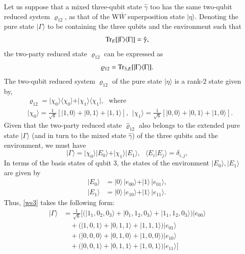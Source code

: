 Let us suppose that a mixed  three-qubit state $\hat\gamma$ too has the same two-qubit reduced system $\varrho_{12}$, as that of the W$\bar W$ superposition state $\vert \eta\rangle.$ Denoting the pure state $\vert \Gamma\rangle$ to be containing the three qubits and the environment such that  
\[ 
{\rm Tr}_{E}[\vert\Gamma\rangle\langle \Gamma\vert]=\hat\gamma,
\] 
the two-party reduced state $\varrho_{12}$ can be expressed as 
$$
\varrho_{12}={\rm Tr}_{3, E}[\vert \Gamma\rangle\langle \Gamma\vert].
$$ 
The two-qubit reduced system $\varrho_{12}$ of the pure state $\vert\eta\rangle$ is a rank-2 state given by,  
\begin{align*}
& \varrho_{12}=\vert \chi_0\rangle\langle \chi_0\vert + 
\vert \chi_1\rangle\langle \chi_1\vert, \ \ \ \mbox{where}\label{ws2}\\ 
& \vert \chi_0\rangle=\frac{1}{\sqrt{6}}[|1,0\rangle+|0,1\rangle+|1,1\rangle], \ \ \vert \chi_1\rangle=\frac{1}{\sqrt{6}}[|0,0\rangle+|0,1\rangle+|1,0\rangle].  \nonumber
\end{align*}
Given that the two-party reduced state $\hat{\varrho}_{12}$ also belongs to the extended pure state $\vert\Gamma\rangle$ (and in turn to the mixed state $\hat\gamma$) of the three qubits and the environment, we must have  
\begin{equation}
\vert\Gamma\rangle=\vert \chi_0\rangle\vert E_0\rangle +\vert \chi_1\rangle\vert E_1\rangle, \ \ \ \langle E_i\vert E_j\rangle=\delta_{i,j},\label{ws3}
 \end{equation}     
In terms of the basis states of qubit 3, the states of the environment $\vert E_{0}\rangle, \vert E_{1}\rangle$ are given by
\begin{align*}
\vert E_0\rangle&=\vert 0\rangle\,  \vert e_{00}\rangle+\vert 1\rangle\,  \vert e_{01}\rangle, \nonumber\\ 
\vert E_1\rangle&=\vert 0\rangle\,  \vert e_{10}\rangle+\vert 1\rangle\,  \vert e_{11}\rangle.
\end{align*}   
Thus, \eqref{ws3} takes the following form: 
\begin{align} 
|\Gamma\rangle&=\frac{1}{\sqrt{6}}[(|1_1,0_2,0_3\rangle+|0_1,1_2,0_3\rangle+|1_1,1_2,0_3\rangle)|e_{00}\rangle\nonumber\\
&\quad +(|1,0,1\rangle+|0,1,1\rangle+|1,1,1\rangle)|e_{01}\rangle \nonumber \\
&\quad + (|0,0,0\rangle+|0,1,0\rangle+|1,0,0\rangle)|e_{10}\rangle\nonumber\\
&\quad +(|0,0,1\rangle +|0,1,1\rangle+|1,0,1\rangle)|e_{11}\rangle] \label{Gamma}
\end{align}
